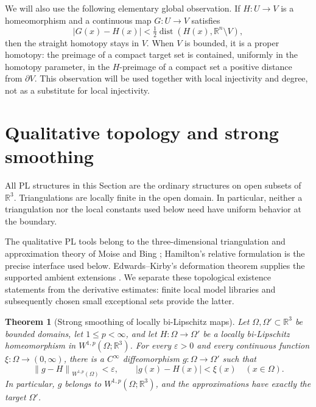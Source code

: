 \documentclass[11pt]{article}
\numberwithin{equation}{section}
\newtheorem{theorem}{Theorem}[section]
\theoremstyle{definition}
\theoremstyle{remark}
\begin{document}
We will also use the following elementary global observation. If $H:U\to V$ is a homeomorphism and a continuous map $G:U\to V$ satisfies
\[
 |G(x)-H(x)|<\tfrac12\operatorname{dist}(H(x),\mathbb R^n\setminus V),
\]
then the straight homotopy stays in $V$. When $V$ is bounded, it is a proper homotopy: the preimage of a compact target set is contained, uniformly in the homotopy parameter, in the $H$-preimage of a compact set a positive distance from $\partial V$. This observation will be used together with local injectivity and degree, not as a substitute for local injectivity.

\tableofcontents
\section{Qualitative topology and strong smoothing}
\label{sec:smoothing}

All PL structures in this Section are the ordinary structures on open
subsets of $\mathbb R^3$.  Triangulations are locally finite in the open domain.
In particular, neither a triangulation nor the local constants used below
need have uniform behavior at the boundary.

The qualitative PL tools belong to the three-dimensional triangulation
and approximation theory of Moise and Bing
\cite{Moise1952Approximation,Moise1952Triangulation,Bing1959}; Hamilton's
relative formulation \cite{Hamilton1976} is the precise interface used
below. Edwards--Kirby's deformation theorem supplies the supported
ambient extensions \cite{EdwardsKirby1971}. We separate these
topological existence statements from the derivative estimates:
finite local model libraries and subsequently chosen small exceptional
sets provide the latter.

\begin{theorem}[Strong smoothing of locally bi-Lipschitz maps]
\label{sm:smoothing}
Let $\Omega,\Omega'\subset\mathbb R^3$ be bounded domains, let
$1\le p<\infty$, and let $H:\Omega\to\Omega'$ be a locally
bi-Lipschitz homeomorphism in $W^{1,p}(\Omega;\mathbb R^3)$.  For every
$\varepsilon>0$ and every continuous function $\xi:\Omega\to(0,\infty)$,
there is a $C^\infty$ diffeomorphism $g:\Omega\to\Omega'$ such that
\begin{equation}
 \label{sm:smoothing-conclusion}
 \left\lVert g-H\right\rVert_{W^{1,p}(\Omega)}<\varepsilon,
 \qquad |g(x)-H(x)|<\xi(x)\quad(x\in\Omega).
\end{equation}
In particular, $g$ belongs to $W^{1,p}(\Omega;\mathbb R^3)$, and the
approximations have exactly the target $\Omega'$.
\end{theorem}
\end{document}
